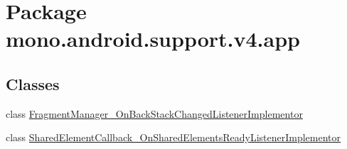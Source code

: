 \hypertarget{namespacemono_1_1android_1_1support_1_1v4_1_1app}{
\section{Package mono.android.support.v4.app}
\label{namespacemono_1_1android_1_1support_1_1v4_1_1app}
}
\subsection*{Classes}
\begin{CompactItemize}
\item 
class \hyperlink{classmono_1_1android_1_1support_1_1v4_1_1app_1_1_fragment_manager___on_back_stack_changed_listener_implementor}{FragmentManager\_\-OnBackStackChangedListenerImplementor}
\item 
class \hyperlink{classmono_1_1android_1_1support_1_1v4_1_1app_1_1_shared_element_callback___on_shared_elements_ready_listener_implementor}{SharedElementCallback\_\-OnSharedElementsReadyListenerImplementor}
\end{CompactItemize}
